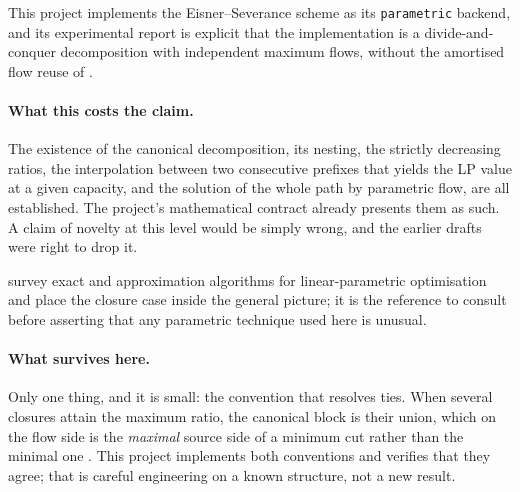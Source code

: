 This project implements the Eisner--Severance scheme as its \texttt{parametric}
backend, and its experimental report is explicit that the implementation is a
divide-and-conquer decomposition with independent maximum flows, without the
amortised flow reuse of \citet{GalloEtAl1989}.

\paragraph{What this costs the claim.} The existence of the canonical
decomposition, its nesting, the strictly decreasing ratios, the interpolation
between two consecutive prefixes that yields the LP value at a given capacity,
and the solution of the whole path by parametric flow, are all established. The
project's mathematical contract already presents them as such. A claim of
novelty at this level would be simply wrong, and the earlier drafts were right
to drop it.

\citet{NemeschEtAl2025} survey exact and approximation algorithms for
linear-parametric optimisation and place the closure case inside the general
picture; it is the reference to consult before asserting that any parametric
technique used here is unusual.

\paragraph{What survives here.} Only one thing, and it is small: the convention
that resolves ties. When several closures attain the maximum ratio, the
canonical block is their union, which on the flow side is the \emph{maximal}
source side of a minimum cut rather than the minimal one
\citep{PicardQueyranne1980,PicardQueyranne1982}. This project implements both
conventions and verifies that they agree; that is careful engineering on a known
structure, not a new result.

